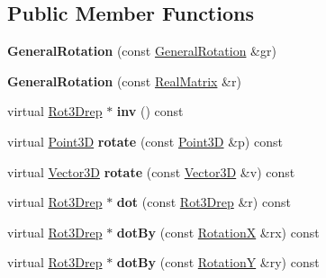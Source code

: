 \subsection*{Public Member Functions}
\begin{DoxyCompactItemize}
\item 
\mbox{\label{classGeneralRotation_a26f398a5a67a365017c59808e2b8a4fe}} 
{\bfseries General\+Rotation} (const \hyperlink{classGeneralRotation}{General\+Rotation} \&gr)
\item 
\mbox{\label{classGeneralRotation_a05513fbb0463c33ac98925842902a12f}} 
{\bfseries General\+Rotation} (const \hyperlink{classTLAS_1_1Matrix}{Real\+Matrix} \&r)
\item 
\mbox{\label{classGeneralRotation_a7fcd451d202938f6b229f0376cd01f07}} 
virtual \hyperlink{classRot3Drep}{Rot3\+Drep} $\ast$ {\bfseries inv} () const
\item 
\mbox{\label{classGeneralRotation_a30e2330a1a0bb094e7aa8e52e71f8867}} 
virtual \hyperlink{classTVec3D}{Point3D} {\bfseries rotate} (const \hyperlink{classTVec3D}{Point3D} \&p) const
\item 
\mbox{\label{classGeneralRotation_afa80b3aa4026891ef4cf83c7967356be}} 
virtual \hyperlink{classTVec3D}{Vector3D} {\bfseries rotate} (const \hyperlink{classTVec3D}{Vector3D} \&v) const
\item 
\mbox{\label{classGeneralRotation_aa8f316924815641078cc79a9dcb26bc1}} 
virtual \hyperlink{classRot3Drep}{Rot3\+Drep} $\ast$ {\bfseries dot} (const \hyperlink{classRot3Drep}{Rot3\+Drep} \&r) const
\item 
\mbox{\label{classGeneralRotation_a41230f5508a00ea39a18e5877229f7aa}} 
virtual \hyperlink{classRot3Drep}{Rot3\+Drep} $\ast$ {\bfseries dot\+By} (const \hyperlink{classRotationX}{RotationX} \&rx) const
\item 
\mbox{\label{classGeneralRotation_a1a2122211fed615b6638f966236d9b0d}} 
virtual \hyperlink{classRot3Drep}{Rot3\+Drep} $\ast$ {\bfseries dot\+By} (const \hyperlink{classRotationY}{RotationY} \&ry) const

\end{DoxyCompactItemize}
